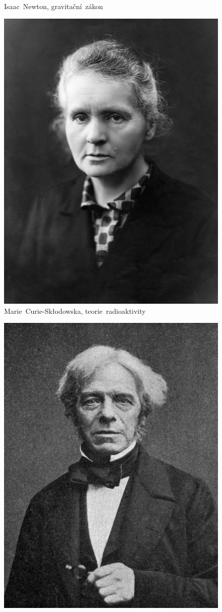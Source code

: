 \documentclass{../../../../style/mkimain}
\begin{document}
\begin{figure}[H]
\begin{center}
        Isaac~Newton, gravitační~zákon
    \end{center}
  \endminipage
\end{figure}
\vspace{0.5cm}
\begin{figure}[H]
  \begin{center}
    \includegraphics[width=0.8\linewidth]{images/marie-curie-sklodowska.jpg}
        Marie~Curie-Skłodowska, teorie~radioaktivity
      \end{center}
  \endminipage\hfill
  \begin{center}
    \includegraphics[width=0.8\linewidth]{images/michael-faraday.jpeg}

\end{center}
\end{figure}
\end{document}

